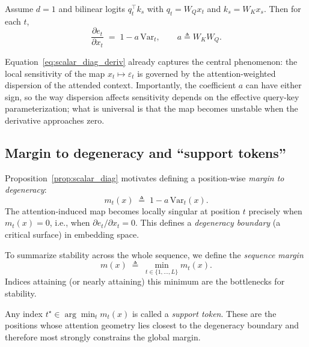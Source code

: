\documentclass[11pt]{article}
\begin{document}
\begin{proposition}
\label{prop:scalar_diag}
Assume $d=1$ and bilinear logits $q_t^\top k_s$ with $q_t=W_Q x_t$ and $k_s=W_K x_s$. Then for each $t$,
\begin{equation}
\frac{\partial e_t}{\partial x_t}
\;=\;
1 - a\,\mathrm{Var}_t,
\qquad
a \triangleq W_K W_Q .
\label{eq:scalar_diag_deriv}
\end{equation}
\end{proposition}

Equation~\eqref{eq:scalar_diag_deriv} already captures the central phenomenon: the local sensitivity of the map $x_t\mapsto \varepsilon_t$ is governed by the attention-weighted dispersion of the attended context.
Importantly, the coefficient $a$ can have either sign, so the way dispersion affects sensitivity depends on the effective query-key parameterization; what is universal is that the map becomes unstable when the derivative approaches zero.

\subsection{Margin to degeneracy and ``support tokens''}
\label{subsec:margin_support_tokens}

Proposition~\ref{prop:scalar_diag} motivates defining a position-wise \emph{margin to degeneracy}:
\begin{equation}
m_t(x) \;\triangleq\; 1 - a\,\mathrm{Var}_t(x).
\label{eq:margin_def}
\end{equation}
The attention-induced map becomes locally singular at position $t$ precisely when $m_t(x)=0$, i.e., when $\partial e_t/\partial x_t = 0$.
This defines a \emph{degeneracy boundary} (a critical surface) in embedding space.

To summarize stability across the whole sequence, we define the \emph{sequence margin}
\begin{equation}
m(x) \;\triangleq\; \min_{t\in\{1,\dots,L\}} m_t(x).
\label{eq:global_margin}
\end{equation}
Indices attaining (or nearly attaining) this minimum are the bottlenecks for stability.

\begin{definition}
\label{def:support_tokens}
Any index $t^\star \in \arg\min_t m_t(x)$ is called a \emph{support token}. These are the positions whose attention geometry lies closest to the degeneracy boundary and therefore most strongly constrains the global margin.
\end{definition}
\end{document}
